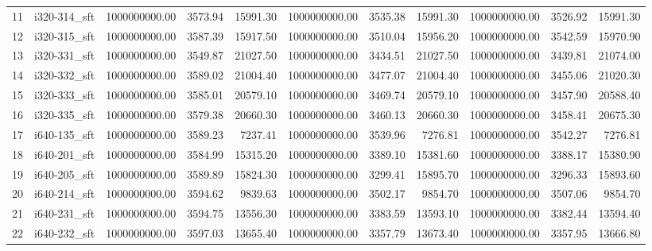 \begin{tabular}{llrrrrrrrrr}
11 &  i320-314\_sft &   1000000000.00 &             3573.94 &      15991.30 &   1000000000.00 &             3535.38 &      15991.30 & 1000000000.00 &           3526.92 &    15991.30 \\
12 &  i320-315\_sft &   1000000000.00 &             3587.39 &      15917.50 &   1000000000.00 &             3510.04 &      15956.20 & 1000000000.00 &           3542.59 &    15970.90 \\
13 &  i320-331\_sft &   1000000000.00 &             3549.87 &      21027.50 &   1000000000.00 &             3434.51 &      21027.50 & 1000000000.00 &           3439.81 &    21074.00 \\
14 &  i320-332\_sft &   1000000000.00 &             3589.02 &      21004.40 &   1000000000.00 &             3477.07 &      21004.40 & 1000000000.00 &           3455.06 &    21020.30 \\
15 &  i320-333\_sft &   1000000000.00 &             3585.01 &      20579.10 &   1000000000.00 &             3469.74 &      20579.10 & 1000000000.00 &           3457.90 &    20588.40 \\
16 &  i320-335\_sft &   1000000000.00 &             3579.38 &      20660.30 &   1000000000.00 &             3460.13 &      20660.30 & 1000000000.00 &           3458.41 &    20675.30 \\
17 &  i640-135\_sft &   1000000000.00 &             3589.23 &       7237.41 &   1000000000.00 &             3539.96 &       7276.81 & 1000000000.00 &           3542.27 &     7276.81 \\
18 &  i640-201\_sft &   1000000000.00 &             3584.99 &      15315.20 &   1000000000.00 &             3389.10 &      15381.60 & 1000000000.00 &           3388.17 &    15380.90 \\
19 &  i640-205\_sft &   1000000000.00 &             3589.89 &      15824.30 &   1000000000.00 &             3299.41 &      15895.70 & 1000000000.00 &           3296.33 &    15893.60 \\
20 &  i640-214\_sft &   1000000000.00 &             3594.62 &       9839.63 &   1000000000.00 &             3502.17 &       9854.70 & 1000000000.00 &           3507.06 &     9854.70 \\
21 &  i640-231\_sft &   1000000000.00 &             3594.75 &      13556.30 &   1000000000.00 &             3383.59 &      13593.10 & 1000000000.00 &           3382.44 &    13594.40 \\
22 &  i640-232\_sft &   1000000000.00 &             3597.03 &      13655.40 &   1000000000.00 &             3357.79 &      13673.40 & 1000000000.00 &           3357.95 &    13666.80 \\

\end{tabular}
